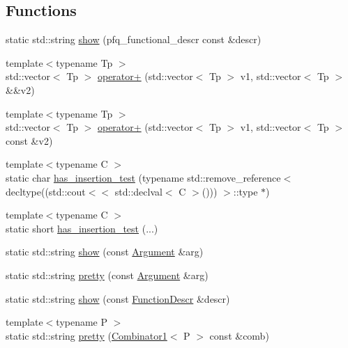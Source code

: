 \subsection*{Functions}
\begin{DoxyCompactItemize}
\item 
static std\+::string \hyperlink{namespacepfq_1_1lang_aaf4ac849c61e156a5be17b618b9eb3bc}{show} (pfq\+\_\+functional\+\_\+descr const \&descr)
\item 
{\footnotesize template$<$typename Tp $>$ }\\std\+::vector$<$ Tp $>$ \hyperlink{namespacepfq_1_1lang_a54f9b99ed2adf6dc2e74d21a38be3bf3}{operator+} (std\+::vector$<$ Tp $>$ v1, std\+::vector$<$ Tp $>$ \&\&v2)
\item 
{\footnotesize template$<$typename Tp $>$ }\\std\+::vector$<$ Tp $>$ \hyperlink{namespacepfq_1_1lang_ae66ee716bfcd7329fbf24620066e48e0}{operator+} (std\+::vector$<$ Tp $>$ v1, std\+::vector$<$ Tp $>$ const \&v2)
\item 
{\footnotesize template$<$typename C $>$ }\\static char \hyperlink{namespacepfq_1_1lang_aa17006c974b74619f845353f18646f1a}{has\+\_\+insertion\+\_\+test} (typename std\+::remove\+\_\+reference$<$ decltype((std\+::cout$<$$<$ std\+::declval$<$ C $>$())) $>$\+::type $\ast$)
\item 
{\footnotesize template$<$typename C $>$ }\\static short \hyperlink{namespacepfq_1_1lang_ad0cb2b1dba5436f8bdf5500f7eaf114c}{has\+\_\+insertion\+\_\+test} (...)
\item 
static std\+::string \hyperlink{namespacepfq_1_1lang_ad43471f09bd362680d44c350bc1d5020}{show} (const \hyperlink{structpfq_1_1lang_1_1Argument}{Argument} \&arg)
\item 
static std\+::string \hyperlink{namespacepfq_1_1lang_aa6334537f6f9c4a38e18f40adb03f35e}{pretty} (const \hyperlink{structpfq_1_1lang_1_1Argument}{Argument} \&arg)
\item 
static std\+::string \hyperlink{namespacepfq_1_1lang_ade377a90a5d90f3ef0fc4107ebc48471}{show} (const \hyperlink{structpfq_1_1lang_1_1FunctionDescr}{Function\+Descr} \&descr)
\item 
{\footnotesize template$<$typename P $>$ }\\static std\+::string \hyperlink{namespacepfq_1_1lang_ad5cfbb22afd79e969a6b21e8236a1965}{pretty} (\hyperlink{structpfq_1_1lang_1_1Combinator1}{Combinator1}$<$ P $>$ const \&comb)
\item 
$$
\end{DoxyCompactItemize}
